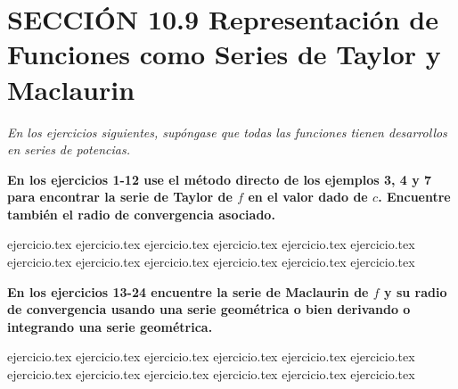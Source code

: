 
\section*{SECCIÓN 10.9 \quad Representación de Funciones como Series de Taylor y Maclaurin}

\noindent\textit{En los ejercicios siguientes, supóngase que todas las funciones tienen desarrollos en series de potencias.}

\vspace{0.3cm}
\noindent\textbf{En los ejercicios 1-12 use el método directo de los ejemplos 3, 4 y 7 para encontrar la serie de Taylor de $f$ en el valor dado de $c$. Encuentre también el radio de convergencia asociado.}
\begin{enumerate}
    {ejercicio.tex}
{ejercicio.tex}
{ejercicio.tex}
{ejercicio.tex}
{ejercicio.tex}
{ejercicio.tex}
{ejercicio.tex}
{ejercicio.tex}
{ejercicio.tex}
{ejercicio.tex}
{ejercicio.tex}
{ejercicio.tex}
\end{enumerate}

\vspace{0.3cm}
\noindent\textbf{En los ejercicios 13-24 encuentre la serie de Maclaurin de $f$ y su radio de convergencia usando una serie geométrica o bien derivando o integrando una serie geométrica.}
\begin{enumerate}
    \setcounter{enumi}{12}
    {ejercicio.tex}
{ejercicio.tex}
{ejercicio.tex}
{ejercicio.tex}
{ejercicio.tex}
{ejercicio.tex}
{ejercicio.tex}
{ejercicio.tex}
{ejercicio.tex}
{ejercicio.tex}
{ejercicio.tex}
{ejercicio.tex}
\end{enumerate}

